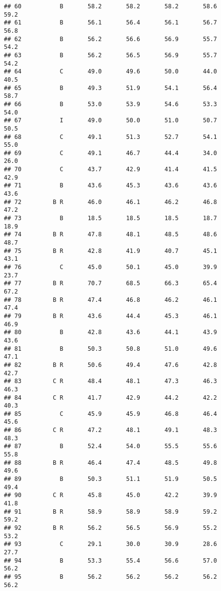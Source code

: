 \documentclass[]{article}
\begin{document}
\begin{verbatim}
## 60           B       58.2       58.2       58.2       58.6       59.2
## 61           B       56.1       56.4       56.1       56.7       56.8
## 62           B       56.2       56.6       56.9       55.7       54.2
## 63           B       56.2       56.5       56.9       55.7       54.2
## 64           C       49.0       49.6       50.0       44.0       40.5
## 65           B       49.3       51.9       54.1       56.4       58.7
## 66           B       53.0       53.9       54.6       53.3       54.0
## 67           I       49.0       50.0       51.0       50.7       50.5
## 68           C       49.1       51.3       52.7       54.1       55.0
## 69           C       49.1       46.7       44.4       34.0       26.0
## 70           C       43.7       42.9       41.4       41.5       42.9
## 71           B       43.6       45.3       43.6       43.6       43.6
## 72         B R       46.0       46.1       46.2       46.8       47.2
## 73           B       18.5       18.5       18.5       18.7       18.9
## 74         B R       47.8       48.1       48.5       48.6       48.7
## 75         B R       42.8       41.9       40.7       45.1       43.1
## 76           C       45.0       50.1       45.0       39.9       23.7
## 77         B R       70.7       68.5       66.3       65.4       67.2
## 78         B R       47.4       46.8       46.2       46.1       47.4
## 79         B R       43.6       44.4       45.3       46.1       46.9
## 80           B       42.8       43.6       44.1       43.9       43.6
## 81           B       50.3       50.8       51.0       49.6       47.1
## 82         B R       50.6       49.4       47.6       42.8       42.7
## 83         C R       48.4       48.1       47.3       46.3       46.3
## 84         C R       41.7       42.9       44.2       42.2       40.3
## 85           C       45.9       45.9       46.8       46.4       45.6
## 86         C R       47.2       48.1       49.1       48.3       48.3
## 87           B       52.4       54.0       55.5       55.6       55.8
## 88         B R       46.4       47.4       48.5       49.8       49.6
## 89           B       50.3       51.1       51.9       50.5       49.4
## 90         C R       45.8       45.0       42.2       39.9       41.8
## 91         B R       58.9       58.9       58.9       59.2       59.2
## 92         B R       56.2       56.5       56.9       55.2       53.2
## 93           C       29.1       30.0       30.9       28.6       27.7
## 94           B       53.3       55.4       56.6       57.0       56.2
## 95           B       56.2       56.2       56.2       56.2       56.2

\end{verbatim}
\end{document}
